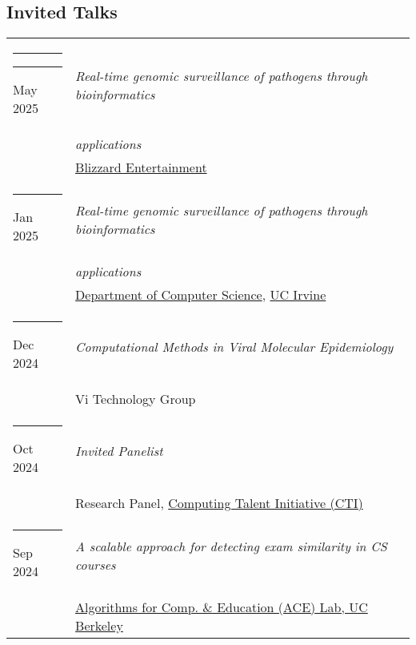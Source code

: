 \documentclass[margin,line]{res}
\begin{document}
\begin{resume}
\section{\sc Invited Talks}
\begin{longtable}{@{}p{0.7in}p{4in}}\rule{-1mm}{4.5mm}
\hspace*{-4mm} \rule{-1mm}{5mm} May 2025 & \textit{Real-time genomic surveillance of pathogens through bioinformatics}\\*
\hspace*{-4mm} & \hspace{4mm} \textit{applications}\\*
\hspace*{-4mm} & \hspace{4mm} \href{https://www.blizzard.com/}{Blizzard Entertainment}\\
\hspace*{-4mm} \rule{-1mm}{5mm} Jan 2025 & \textit{Real-time genomic surveillance of pathogens through bioinformatics}\\*
\hspace*{-4mm} & \hspace{4mm} \textit{applications}\\*
\hspace*{-4mm} & \hspace{4mm} \href{https://ics.uci.edu/}{Department of Computer Science}, \href{https://uci.edu/}{UC Irvine}\\
\hspace*{-4mm} \rule{-1mm}{5mm} Dec 2024 & \textit{Computational Methods in Viral Molecular Epidemiology}\\*
\hspace*{-4mm} & \hspace{4mm} Vi Technology Group\\
\hspace*{-4mm} \rule{-1mm}{5mm} Oct 2024 & \textit{Invited Panelist}\\*
\hspace*{-4mm} & \hspace{4mm} Research Panel, \href{https://computingtalentinitiative.org/}{Computing Talent Initiative (CTI)}\\
\hspace*{-4mm} \rule{-1mm}{5mm} Sep 2024 & \textit{A scalable approach for detecting exam similarity in CS courses}\\*
\hspace*{-4mm} & \hspace{4mm} \href{https://acelab.berkeley.edu/}{Algorithms for Comp. \& Education (ACE) Lab, UC Berkeley}\\

\end{longtable}
\end{resume}
\end{document}
